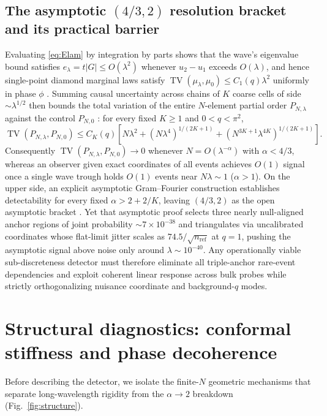 \documentclass[11pt,a4paper]{article}
\newcommand{\TV}{\operatorname{TV}}
\begin{document}
\subsection{The asymptotic \texorpdfstring{$(4/3, 2)$}{(4/3, 2)} resolution bracket and its practical barrier}
Evaluating \eqref{eq:Elam} by integration by parts shows that the wave's
eigenvalue bound satisfies $e_\lambda = t|G| \le O(\lambda^2)$ whenever $u_2 - u_1$
exceeds $O(\lambda)$, and hence single-point diamond marginal laws satisfy
$\TV(\mu_\lambda, \mu_0) \le C_1(q)\lambda^2$ uniformly in phase $\phi$
\cite{onepointbound}. Summing causal uncertainty across chains of $K$ coarse
cells of side $\sim \lambda^{1/2}$ then bounds the total variation of the
entire $N$-element partial order $P_{N,\lambda}$ against the control
$P_{N,0}$ \cite{quantizedbound}: for every fixed $K \ge 1$ and $0 < q < \pi^2$,
\begin{equation}
 \TV(P_{N,\lambda}, P_{N,0}) \le C_K(q)\left[
 N\lambda^2 + (N\lambda^4)^{1/(2K+1)} + (N^{3K+1}\lambda^{4K})^{1/(2K+1)}
 \right].
 \label{eq:bound43}
\end{equation}
Consequently $\TV(P_{N,\lambda}, P_{N,0}) \to 0$ whenever $N = O(\lambda^{-\alpha})$
with $\alpha < 4/3$, whereas an observer given exact coordinates of all events
achieves $O(1)$ signal once a single wave trough holds $O(1)$ events near
$N\lambda \sim 1$ ($\alpha > 1$). On the upper side, an explicit asymptotic
Gram--Fourier construction establishes detectability for every fixed
$\alpha > 2 + 2/K$, leaving $(4/3, 2)$ as the open asymptotic bracket
\cite{gramfourier}. Yet that asymptotic proof selects three nearly null-aligned
anchor regions of joint probability $\sim 7\times 10^{-38}$ and triangulates via
uncalibrated coordinates whose flat-limit jitter scales as $74.5/\sqrt{n_{\text{ref}}}$
at $q=1$, pushing the asymptotic signal above noise only around $\lambda \sim 10^{-40}$.
Any operationally viable sub-discreteness detector must therefore eliminate all
triple-anchor rare-event dependencies and exploit coherent linear response across
bulk probes while strictly orthogonalizing nuisance coordinate and background-$q$ modes.

\section{Structural diagnostics: conformal stiffness and phase decoherence}\label{sec:diagnostics}
Before describing the detector, we isolate the finite-$N$ geometric mechanisms
that separate long-wavelength rigidity from the $\alpha \to 2$ breakdown
(Fig.~\ref{fig:structure}).
\end{document}
